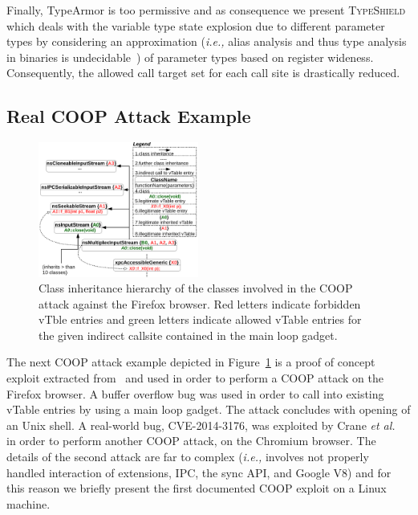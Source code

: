 Finally, TypeArmor is too permissive and as consequence we present 
\textsc{TypeShield} which deals with the variable type state explosion due to different parameter types by considering an 
approximation (\textit{i.e.,} alias analysis and thus type analysis in binaries is undecidable~\cite{alias:undecidable}) of 
parameter types based on register wideness. Consequently, the allowed call target set for each call site is drastically reduced.

\subsection{Real COOP Attack Example}
\label{Running Example: CVE X}
\begin{figure}[h!]
    \centering
    \includegraphics[width=0.47\textwidth]{figures/class_hierarchy.pdf}
\caption{Class inheritance hierarchy of the classes involved in the COOP attack against the Firefox browser. Red letters 
indicate forbidden vTble entries and green letters indicate allowed vTable entries for the given indirect callsite
contained in the main loop gadget.}
\label{Class exploit}
\end{figure}
The next COOP attack example depicted in Figure~\ref{Class exploit}
is a proof of concept exploit extracted from~\cite{schuster:coop} and used in order to perform 
a COOP attack on the Firefox browser. A buffer overflow bug was used in order to call 
into existing vTable entries by using a main loop gadget. 
The attack concludes with opening of an Unix shell. 
A real-world bug, CVE-2014-3176, was exploited by Crane \textit{et al.}~\cite{crane:readactor++}
in order to perform another COOP attack, on the Chromium browser. The details of the 
second attack are far to complex (\textit{i.e.,} involves not properly handled interaction of 
extensions, IPC, the sync API, and Google V8) and for this reason we briefly present the first 
documented COOP exploit on a Linux machine.

